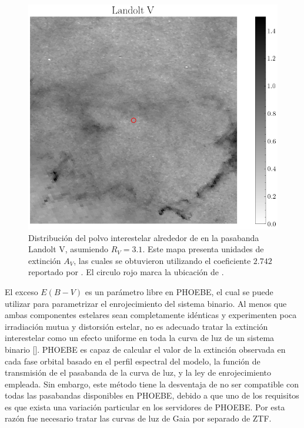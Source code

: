 \begin{figure}[!ht]
    \centering
    \includegraphics[scale=0.54]{Conclusion/Figures/Figura Mapa Polvo Landolt V.png}
    \caption{Distribución del polvo interestelar alrededor de \atoObjId en la
    pasabanda Landolt V, asumiendo $R_V = 3.1$. Este mapa presenta unidades de
    extinción $A_V$, las cuales se obtuvieron utilizando el coeficiente $2.742$
    reportado por
    . El
    circulo rojo marca la ubicación de \atoObjIdNoSpace.}
    \label{figuraMapaPolvoLandoltV}
\end{figure}

El exceso $E(B-V)$ es un parámetro libre en PHOEBE, el cual se puede utilizar
para parametrizar el enrojecimiento del sistema binario. Al menos que ambas
componentes estelares sean completamente idénticas y experimenten poca
irradiación mutua y distorsión estelar, no es adecuado tratar la extinción
interestelar como un efecto uniforme en toda la curva de luz de un sistema
binario
[].
PHOEBE es capaz de calcular el valor de la extinción observada en cada fase
orbital basado en el perfil espectral del modelo, la función de transmisión de
el pasabanda de la curva de luz, y la ley de enrojecimiento empleada. Sin
embargo, este método tiene la desventaja de no ser compatible con todas las
pasabandas disponibles en PHOEBE, debido a que uno de los requisitos es que
exista una variación particular  en los servidores de PHOEBE. Por esta
razón fue necesario tratar las curvas de luz de Gaia por separado de ZTF.


